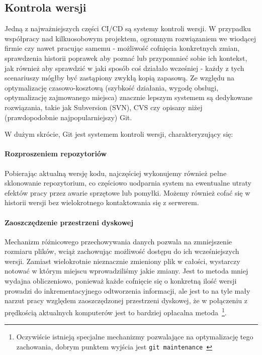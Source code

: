 \subsection{Kontrola wersji}

Jedną z najważniejszych części CI/CD są systemy kontroli wersji. 
W przypadku współpracy nad kilkuosobowym projektem, ogromnym rozwiązaniem 
we wiodącej firmie czy nawet pracując samemu - możliwość cofnięcia konkretnych zmian, 
sprawdzenia historii poprawek aby poznać lub przypomnieć sobie ich kontekst, 
jak również aby sprawdzić w jaki sposób coś działało wcześniej - każdy z tych scenariuszy 
mógłby być zastąpiony zwykłą kopią zapasową. 
Ze względu na optymalizację czasowo-kosztową (szybkość działania, 
wygodę obsługi, optymalizację zajmowanego miejsca) znacznie lepszym systemem są dedykowane 
rozwiązania, takie jak Subversion (SVN), CVS czy opisany niżej (prawdopodobnie najpopularniejszy) Git.

W dużym skrócie, Git jest systemem kontroli wersji, charakteryzujący się:
\paragraph{Rozproszeniem repozytoriów}
Pobierając aktualną wersję kodu, najczęściej wykonujemy również pełne sklonowanie repozytorium, 
co częściowo uodparnia system na ewentualne utraty efektów pracy przez awarie sprzętowe lub pomyłki.
Możemy również cofać się w historii wersji bez wielokrotnego kontaktowania się z serwerem.

\paragraph{Zaoszczędzenie przestrzeni dyskowej}
Mechanizm różnicowego przechowywania danych pozwala na zmniejszenie rozmiaru plików, 
wciąż zachowując możliwość dostępu do ich wcześniejszych wersji.
Zamiast wielokrotnie nieznacznie zmieniony plik w całości, wystarczy notować w którym miejscu 
wprowadziliśmy jakie zmiany. Jest to metoda mniej wydajna obliczeniowo, ponieważ każde cofnięcie się 
o konkretną ilość wersji prowadzi do inkrementacyjnego odtworzenia informacji, 
ale jest to na tyle mały narzut pracy względem zaoszczędzonej przestrzeni dyskowej, że w połączeniu 
z prędkością aktualnych komputerów jest to bardziej opłacalna metoda~\cprotect\footnote{%
    Oczywiście istnieją specjalne mechanizmy pozwalające na optymalizację tego zachowania, 
    dobrym punktem wyjścia jest \verb|git maintenance|~\cite{gitMaintenance}}.

